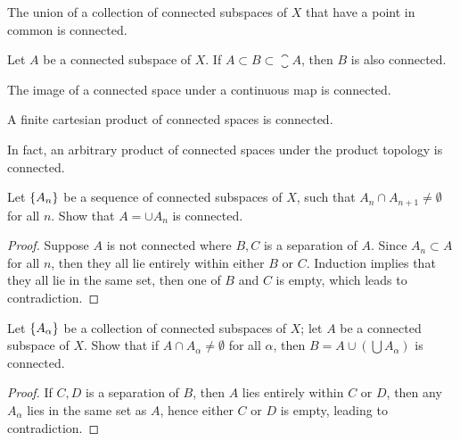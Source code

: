 \documentclass[12pt,a4paper]{article}
\begin{document}
    \begin{thm}
        The union of a collection of connected subspaces of $X$ that have a point in common is connected.
    \end{thm}
    \hfill

    \begin{thm}
        Let $A$ be a connected subspace of $X$. If $A\subset B\subset\closure{A}$, then $B$ is also connected.
    \end{thm}
    \hfill

    \begin{thm}
        The image of a connected space under a continuous map is connected.
    \end{thm}
    \hfill

    \begin{thm}
        A finite cartesian product of connected spaces is connected.
    \end{thm}
    \begin{remark}
        In fact, an arbitrary product of connected spaces under the product topology is connected.
    \end{remark}
    \hfill

    \begin{ex}
        Let $\left\{A_n\right\}$ be a sequence of connected subspaces of $X$, such that $A_n\cap A_{n+1}\neq\emptyset$ for all $n$. Show that $A=\cup A_n$ is connected.
    \end{ex}
    \begin{proof}
        Suppose $A$ is not connected where $B,C$ is a separation of $A$. Since $A_n\subset A$ for all $n$, then they all lie entirely within either $B$ or $C$. Induction implies that they all lie in the same set, then one of $B$ and $C$ is empty, which leads to contradiction.  
    \end{proof}
    \hfill

    \begin{ex}
        Let $\left\{A_\alpha\right\}$ be a collection of connected subspaces of $X$; let $A$ be a connected subspace of $X$. Show that if $A\cap A_\alpha\neq\emptyset$ for all $\alpha$, then $B=A\cup(\bigcup A_\alpha)$ is connected.
    \end{ex}
    \begin{proof}
        If $C,D$ is a separation of $B$, then $A$ lies entirely within $C$ or $D$, then any $A_\alpha$ lies in the same set as $A$, hence either $C$ or $D$ is empty, leading to contradiction.
    \end{proof}
    \hfill
\end{document}
